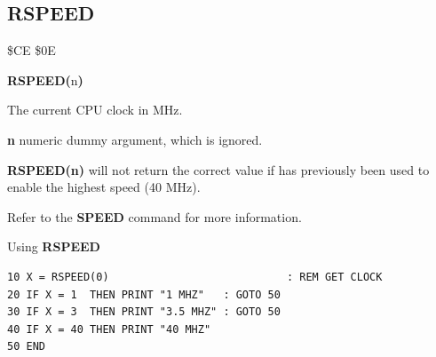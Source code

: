 \subsection{RSPEED}
\begin{description}[leftmargin=2cm,style=nextline]
\item [Token:]    \$CE \$0E

\item [Format:]   {\bf RSPEED(}n{\bf)}

\item [Returns:]  The current CPU clock in MHz.

                  {\bf n} numeric dummy argument, which is ignored.

\item [Remarks:]  {\bf RSPEED(n)} will not return the correct value if  has previously been used to enable the highest speed (40 MHz).

                  Refer to the {\bf SPEED} command for more information.

\item [Example:]  Using {\bf RSPEED}

\begin{tcolorbox}[colback=black,coltext=white]
\verbatimfont{\codefont}
\begin{verbatim}
10 X = RSPEED(0)                            : REM GET CLOCK
20 IF X = 1  THEN PRINT "1 MHZ"   : GOTO 50
30 IF X = 3  THEN PRINT "3.5 MHZ" : GOTO 50
40 IF X = 40 THEN PRINT "40 MHZ"
50 END
\end{verbatim}
\end{tcolorbox}
\end{description}


\newpage
